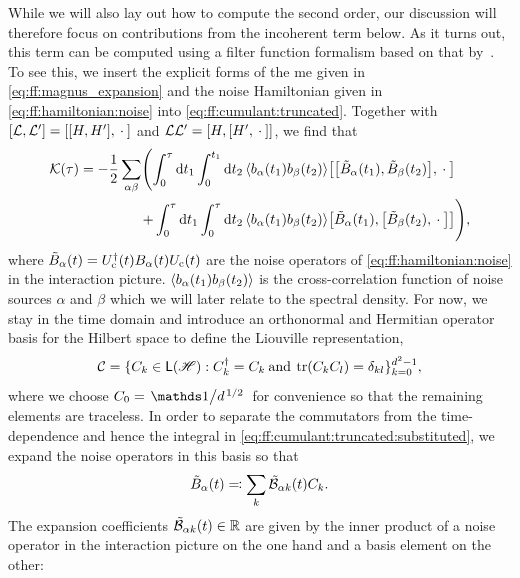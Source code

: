 While we will also lay out how to compute the second order, our discussion will therefore focus on contributions from the incoherent term below.
As it turns out, this term can be computed using a filter function formalism based on that by~\citeauthor{Green2013}.
To see this, we insert the explicit forms of the \gls{me} given in \cref{eq:ff:magnus_expansion} and the noise Hamiltonian given in \cref{eq:ff:hamiltonian:noise} into \cref{eq:ff:cumulant:truncated}.
Together with $\comm{\mc{L}}{\mc{L}'} = \comm{\comm{H}{H'}}{\placeholder}$ and $\mc{L}\mc{L}' = \comm{H}{\comm{H'}{\placeholder}}$, we find that
\begin{align}
    \cumulantfun(\tau) = -\frac{1}{2}\sum_{\alpha\beta}\Biggl(\int_0^\tau\dd{t_1}\int_0^{t_1}\dd{t_2}
                              \expval{b_\alpha(t_1) b_\beta(t_2)} & \comm{\comm{\tilde{B}_\alpha(t_1)}{\tilde{B}_\beta(t_2)}}{\placeholder} \notag\\
                                                             +\int_0^\tau\dd{t_1}\int_0^\tau\dd{t_2}
                              \expval{b_\alpha(t_1) b_\beta(t_2)} & \comm{\tilde{B}_\alpha(t_1)}{\comm{\tilde{B}_\beta(t_2)}{\placeholder}}\Biggr), \label{eq:ff:cumulant:truncated:substituted}
\end{align}
where $\tilde{B}_\alpha(t) = U_{\mathrm{c}}^\dagger(t)B_\alpha(t)U_{\mathrm{c}}(t)$ are the noise operators of \cref{eq:ff:hamiltonian:noise} in the interaction picture.
$\ev{b_\alpha(t_1)b_\beta(t_2)}$ is the cross-correlation function of noise sources $\alpha$ and $\beta$ which we will later relate to the spectral density.
For now, we stay in the time domain and introduce an orthonormal and Hermitian operator basis for the Hilbert space \Hspace to define the Liouville representation,
\begin{equation}\label{eq:ff:basis}
    \mathcal{C} = \lbrace C_k\in\mathsf{L}(\mathscr{H}): C_k^\dagger = C_k\:\text{and}\:\tr(C_k C_l) = \delta_{kl}\rbrace_{k=0}^{d^2-1},
\end{equation}
where we choose $C_0 = \flatfrac{\eye}{d^{\flatfrac{1}{2}}}$ for convenience so that the remaining elements are traceless.
In order to separate the commutators from the time-dependence and hence the integral in \cref{eq:ff:cumulant:truncated:substituted}, we expand the noise operators in this basis so that
\begin{equation}\label{eq:ff:noise_operators:expanded}
    \tilde{B}_\alpha(t) \eqqcolon \sum_k\tilde{\mathcal{B}}_{\alpha k}(t) C_k.
\end{equation}
The expansion coefficients $\tilde{\mathcal{B}}_{\alpha k}(t)\in\mathbb{R}$ are given by the inner product of a noise operator in the interaction picture on the one hand and a basis element on the other:
